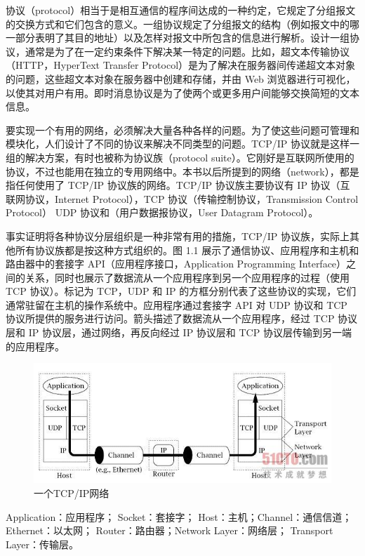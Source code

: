 		协议（protocol）相当于是相互通信的程序间达成的一种约定，它规定了分组报文的交换方式和它们包含的意义。一组协议规定了分组报文的结构（例如报文中的哪一部分表明了其目的地址）以及怎样对报文中所包含的信息进行解析。设计一组协议，通常是为了在一定约束条件下解决某一特定的问题。比如，超文本传输协议（HTTP，HyperText Transfer Protocol）是为了解决在服务器间传递超文本对象的问题，这些超文本对象在服务器中创建和存储，并由 Web 浏览器进行可视化，以使其对用户有用。即时消息协议是为了使两个或更多用户间能够交换简短的文本信息。

		要实现一个有用的网络，必须解决大量各种各样的问题。为了使这些问题可管理和模块化，人们设计了不同的协议来解决不同类型的问题。TCP/IP 协议就是这样一组的解决方案，有时也被称为协议族（protocol suite）。它刚好是互联网所使用的协议，不过也能用在独立的专用网络中。本书以后所提到的网络（network），都是指任何使用了 TCP/IP 协议族的网络。TCP/IP 协议族主要协议有 IP 协议（互联网协议，Internet Protocol），TCP 协议（传输控制协议，Transmission Control Protocol） UDP 协议和（用户数据报协议，User Datagram Protocol）。

		事实证明将各种协议分层组织是一种非常有用的措施，TCP/IP 协议族，实际上其他所有协议族都是按这种方式组织的。图 1.1 展示了通信协议、应用程序和主机和路由器中的套接字 API（应用程序接口，Application Programming Interface）之间的关系，同时也展示了数据流从一个应用程序到另一个应用程序的过程（使用 TCP 协议）。标记为 TCP，UDP 和 IP 的方框分别代表了这些协议的实现，它们通常驻留在主机的操作系统中。应用程序通过套接字 API 对 UDP 协议和 TCP 协议所提供的服务进行访问。箭头描述了数据流从一个应用程序，经过 TCP 协议层和 IP 协议层，通过网络，再反向经过 IP 协议层和 TCP 协议层传输到另一端的应用程序。

		\begin{figure}[htbp]%
			\centering
			\includegraphics[scale=.6]{img/01.01.jpg}
			\caption{一个TCP/IP网络}
			\label{fig:tcpip.net.trans}
		\end{figure}

		Application：应用程序； Socket：套接字； Host：主机；Channel：通信信道； Ethernet：以太网； Router：路由器；Network Layer：网络层； Transport Layer：传输层。

